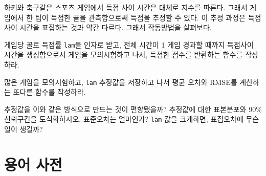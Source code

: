 \begin{exercise}

하키와 축구같은 스포츠 게임에서 득점 사이 시간은 대체로 지수를 따른다.
그래서 게임에서 한 팀이 득점한 골을 관측함으로써 득점을 추정할 수 있다.
이 추정 과정은 득점 사이 시간을 표집하는 것과 약간 다르다. 
그래서 작동방법을 살펴보다.


게임당 골로 득점률 {\tt lam}을 인자로 받고,
전체 시간이 1 게임 경과할 때까지 득점사이 시간을 생성함으로서 게임을 
모의시험하고 나서, 득점한 점수를 반환하는 함수를 작성하라. 

많은 게임을 모의시험하고, {\tt lam} 추정값을 저장하고 나서
평균 오차와 RMSE를 계산하는 또다른 함수를 작성하라.

추정값을 이와 같은 방식으로 만드는 것이 편향됐을까?
추정값에 대한 표본분포와 90\% 신뢰구간을 도식화하시오.
표준오차는 얼마인가? 
{\tt lam} 값을 크게하면, 표집오차에 무슨일이 생길까?


\end{exercise}


\section{용어 사전}

